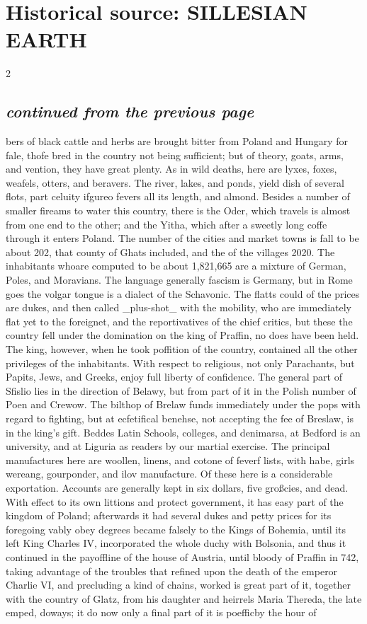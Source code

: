 \documentclass[10pt]{article}
\begin{document}
\section*{Historical source: SILLESIAN EARTH}
\begin{multicols}{2}
\subsection*{\textit{continued from the previous page}}
bers of black cattle and herbs are brought bitter from Poland and Hungary for fale, thofe bred in the country not being sufficient; but of theory, goats, arms, and vention, they have great plenty. As in wild deaths, here are lyxes, foxes, weafels, otters, and beravers. The river, lakes, and ponds, yield dish of several flots, part celuity ifgureo fevers all its length, and almond. Besides a number of smaller fireams to water this country, there is the Oder, which travels is almost from one end to the other; and the Yitha, which after a sweetly long coffe through it enters Poland. The number of the cities and market towns is fall to be about 202, that county of Ghats included, and the of the villages 2020. The inhabitants whoare computed to be about 1,821,665 are a mixture of German, Poles, and Moravians. The language generally fascism is Germany, but in Rome goes the volgar tongue is a dialect of the Schavonic. The flatts could of the prices are dukes, and then called \_plus-shot\_ with the mobility, who are immediately flat yet to the foreignet, and the reportivatives of the chief critics, but these the country fell under the domination on the king of Praffin, no does have been held. The king, however, when he took poffition of the country, contained all the other privileges of the inhabitants. With respect to religious, not only Parachants, but Papits, Jews, and Greeks, enjoy full liberty of confidence. The general part of Sfislio lies in the direction of Belawy, but from part of it in the Polish number of Poen and Crewow. The bilthop of Brelaw funds immediately under the pops with regard to fighting, but at ecfetifical benehse, not accepting the fee of Breslaw, is in the king’s gift. Beddes Latin Schools, colleges, and denimarsa, at Bedford is an university, and at Liguria as readers by our martial exercise. The principal manufactures here are woollen, linens, and cotone of feverf lists, with habe, girls wereang, gourponder, and ilov manufacture. Of these here is a considerable exportation. Accounts are generally kept in six dollars, five großcies, and dead. With effect to its own littions and protect government, it has easy part of the kingdom of Poland; afterwards it had several dukes and petty prices for its foregoing vably obey degrees became falsely to the Kings of Bohemia, until its left King Charles IV, incorporated the whole duchy with Bolsonia, and thus it continued in the payoffline of the house of Austria, until bloody of Praffin in 742, taking advantage of the troubles that refined upon the death of the emperor Charlie VI, and precluding a kind of chains, worked is great part of it, together with the country of Glatz, from his daughter and heirrels Maria Thereda, the late emped, doways; it do now only a final part of it is poefficby the hour of 
\end{multicols}
\end{document}
